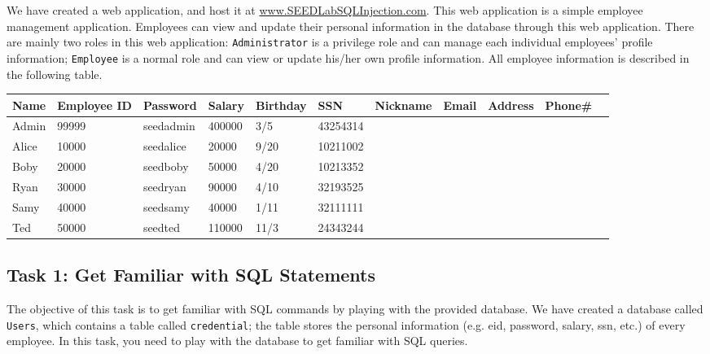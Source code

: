 We have created a web application, and host it at \url{www.SEEDLabSQLInjection.com}. 
This web application is a simple employee 
management application. 
Employees can view and update their personal information 
in the database through this web application. 
There are mainly two roles in this web application: 
{\tt Administrator} is a privilege role and can manage each individual
employees' profile information;
{\tt Employee} is a normal role and can view or update his/her own profile 
information. All employee information is described in the following table.


\vspace{0.1in}
\begin{table}[h]
\begin{adjustbox}{max width=\textwidth}
\begin{tabular}{|l|l|l|l|l|l|l|l|l|l|l|}
\hline
Name 	& Employee ID   & Password	&Salary		&Birthday
&SSN		&Nickname	&Email		&Address	&Phone\# \\
\hline
Admin 	& 99999         & seedadmin	&400000		&3/5		&43254314	&		&		&		&\\
Alice 	& 10000 	& seedalice	&20000		&9/20		&10211002	&		&		&		&\\
Boby 	& 20000         & seedboby 	&50000		&4/20		&10213352	&		&		&		&\\
Ryan    & 30000         & seedryan	&90000		&4/10		&32193525	&		&		&		&\\
Samy 	& 40000		& seedsamy	&40000		&1/11		&32111111 	&		&		&		&\\
Ted     & 50000		& seedted	&110000		&11/3		&24343244	&		&		&		&\\
\hline
\end{tabular}
\end{adjustbox}
\end{table}





\subsection{Task 1: Get Familiar with SQL Statements}
\label{ssec:MySQLConsole}


The objective of this task is to get familiar with SQL commands by playing
with the provided database. We have created a database called {\tt Users},
which contains a table called {\tt credential}; the table stores
the personal information (e.g. eid, password, salary, ssn, etc.) of every
employee. In this task, you need to play with the database to get familiar
with SQL queries.


